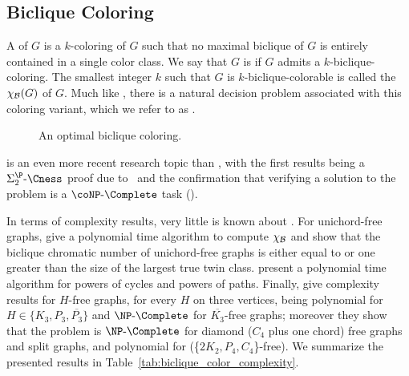 \subsection{Biclique Coloring}
A  of $G$ is a $k$-coloring of $G$ such that no maximal biclique of $G$ is entirely contained in a single color class.
We say that $G$ is  if $G$ admits a $k$-biclique-coloring.
The smallest integer $k$ such that $G$ is $k$-biclique-colorable is called the  $\chi_{\mathcal{B}}(G)$ of $G$.
Much like , there is a natural decision problem associated with this coloring variant, which we refer to as .



\begin{figure}[!htb]
    \centering
    \caption{An optimal biclique coloring.}
    \label{fig:biclique_color}
\end{figure}


 is an even more recent research topic than , with the first results being a $\SiP{2}\text{-}\Cness$ proof due to~\citep{biclique_coloring_complexity} and the confirmation that verifying a solution to the problem is a $\coNP\text{-}\Complete$ task (\cite{biclique_coloring_verification}).

In terms of complexity results, very little is known about .
For unichord-free graphs, \citep{unichord_coloring} give a polynomial time algorithm to compute $\chi_{\mathcal{B}}$ and show that the biclique chromatic number of unichord-free graphs is either equal to or one greater than the size of the largest true twin class.
\citep{biclique_coloring_verification} present a polynomial time algorithm for powers of cycles and powers of paths.
Finally, \citep{biclique_coloring_complexity} give complexity results for $H$-free graphs, for every $H$ on three vertices, being polynomial for $H \in \{K_3, P_3, \overline{P_3}\}$ and $\NPc$ for $\overline{K_3}$-free graphs;
moreover they show that the problem is $\NPc$ for diamond ($C_4$ plus one chord) free graphs and split graphs, and polynomial for  (\{$2K_2,P_4,C_4$\}-free).
We summarize the presented results in Table~\ref{tab:biclique_color_complexity}.


